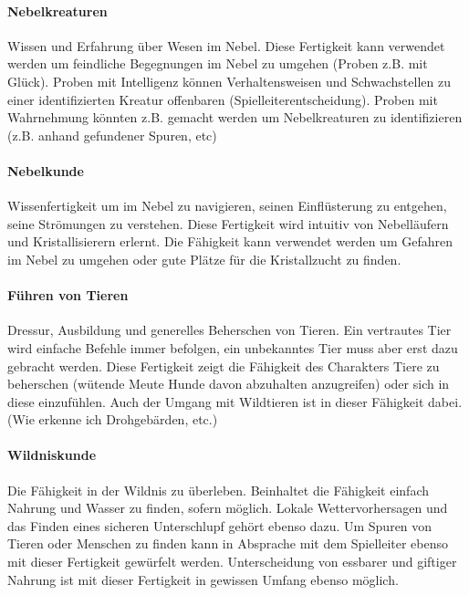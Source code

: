 \documentclass{article}
\begin{document}
\paragraph{Nebelkreaturen}

Wissen und Erfahrung über Wesen im Nebel. Diese Fertigkeit kann verwendet werden um feindliche Begegnungen im Nebel
zu umgehen (Proben z.B. mit Glück). Proben mit Intelligenz können Verhaltensweisen und Schwachstellen zu einer
identifizierten Kreatur offenbaren (Spielleiterentscheidung). Proben mit Wahrnehmung könnten z.B. gemacht werden um
Nebelkreaturen zu identifizieren (z.B. anhand gefundener Spuren, etc)

\paragraph{Nebelkunde}

Wissenfertigkeit um im Nebel zu navigieren, seinen Einflüsterung zu entgehen, seine Strömungen zu verstehen. Diese
Fertigkeit wird intuitiv von Nebelläufern und Kristallisierern erlernt. Die Fähigkeit kann verwendet werden um
Gefahren im Nebel zu umgehen oder gute Plätze für die Kristallzucht zu finden.

\paragraph{Führen von Tieren}

Dressur, Ausbildung und generelles Beherschen von Tieren. Ein vertrautes Tier wird einfache Befehle immer befolgen,
ein unbekanntes Tier muss aber erst dazu gebracht werden. Diese Fertigkeit zeigt die Fähigkeit des Charakters Tiere
zu beherschen (wütende Meute Hunde davon abzuhalten anzugreifen) oder sich in diese einzufühlen. Auch der Umgang mit
Wildtieren ist in dieser Fähigkeit dabei. (Wie erkenne ich Drohgebärden, etc.)

\paragraph{Wildniskunde}

Die Fähigkeit in der Wildnis zu überleben. Beinhaltet die Fähigkeit einfach Nahrung und Wasser zu finden, sofern
möglich. Lokale Wettervorhersagen und das Finden eines sicheren Unterschlupf gehört ebenso dazu. Um Spuren von
Tieren oder Menschen zu finden kann in Absprache mit dem Spielleiter ebenso mit dieser Fertigkeit gewürfelt werden.
Unterscheidung von essbarer und giftiger Nahrung ist mit dieser Fertigkeit in gewissen Umfang ebenso möglich.
\end{document}
